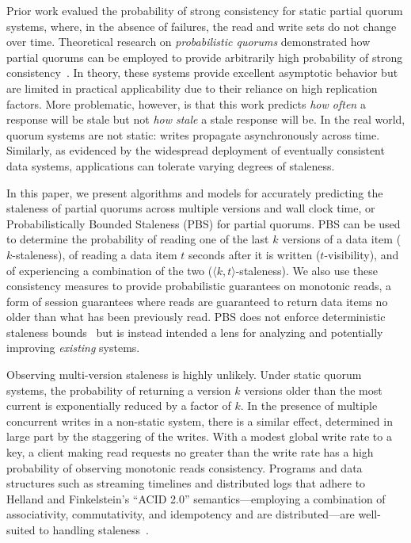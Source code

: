 \documentclass{vldb}
\begin{document}
Prior work evalued the probability of strong consistency for static
partial quorum systems, where, in the absence of failures, the read
and write sets do not change over time.  Theoretical research on
\textit{probabilistic quorums} demonstrated how partial quorums can be
employed to provide arbitrarily high probability of strong
consistency~\cite{prob-quorum}. In theory, these systems provide
excellent asymptotic behavior but are limited in practical
applicability due to their reliance on high replication factors.  More
problematic, however, is that this work predicts \textit{how often} a
response will be stale but not \textit{how stale} a stale response
will be. In the real world, quorum systems are not static: writes
propagate asynchronously across time. Similarly, as evidenced by the
widespread deployment of eventually consistent data systems,
applications can tolerate varying degrees of staleness.

In this paper, we present algorithms and models for accurately
predicting the staleness of partial quorums across multiple versions
and wall clock time, or Probabilistically Bounded Staleness (PBS) for
partial quorums. PBS can be used to determine the probability of
reading one of the last $k$ versions of a data item ($k$-staleness),
of reading a data item $t$ seconds after it is written
($t$-visibility), and of experiencing a combination of the two
($\langle k, t \rangle$-staleness).  We also use these consistency
measures to provide probabilistic guarantees on monotonic reads, a
form of session guarantees where reads are guaranteed to return data
items no older than what has been previously read.  PBS does not
enforce deterministic staleness bounds~\cite{ aqua,
  trapp,vahdat-article, vahdat-bounded, frac} but is instead intended
a lens for analyzing and potentially improving \textit{existing}
systems.

Observing multi-version staleness is highly unlikely.  Under static
quorum systems, the probability of returning a version $k$ versions
older than the most current is exponentially reduced by a factor of
$k$.  In the presence of multiple concurrent writes in a non-static
system, there is a similar effect, determined in large part by the
staggering of the writes.  With a modest global write rate to a key, a
client making read requests no greater than the write rate has a high
probability of observing monotonic reads consistency. Programs and
data structures such as streaming timelines and distributed logs that
adhere to Helland and Finkelstein's ``ACID 2.0'' semantics---employing a combination of associativity, commutativity, and idempotency and
are distributed---are well-suited to handling staleness~\cite{calm,
  helland}.
  
\end{document}
